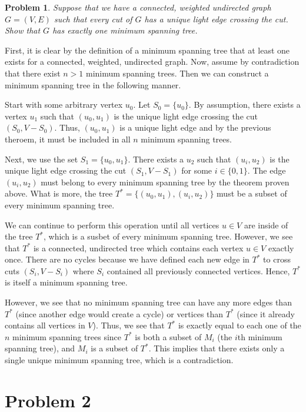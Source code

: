 \documentclass[psamsfonts]{amsart}
\newtheorem{prob}{Problem}[section]
\newenvironment{sol}{{\bfseries Solution}}{\qedsymbol}
\theoremstyle{definition}
\theoremstyle{remark}
\numberwithin{equation}{section}
\begin{document}
\begin{prob}
Suppose that we have a connected, weighted undirected graph $G = (V,E)$ such that
every cut of $G$ has a unique light edge crossing the cut. Show that $G$ has exactly one
minimum spanning tree.
\end{prob}

\begin{sol}
First, it is clear by the definition of a minimum spanning tree that at least one exists for a connected, weighted, undirected graph. Now, assume by contradiction that there exist $n > 1$ minimum spanning trees. Then we can construct a minimum spanning tree in the following manner.

Start with some arbitrary vertex $u_0$. Let $S_0 = \{ u_0 \}$. By assumption, there exists a vertex $u_1$ such that $(u_0, u_1)$ is the unique light edge crossing the cut $(S_0, V - S_0)$. Thus, $(u_0, u_1)$ is a unique light edge and by the previous theroem, it must be included in all $n$ minimum spanning trees. 

Next, we use the set $S_1 = \{ u_0, u_1 \}$. There exists a $u_2$ such that $(u_i, u_2)$ is the unique light edge crossing the cut $(S_1, V - S_1)$ for some $i \in \{0, 1 \}$. The edge $(u_i, u_2)$ must belong to every minimum spanning tree by the theorem proven above. What is more, the tree $T^* = \{ (u_0, u_1), (u_i, u_2) \}$ must be a subset of every minimum spanning tree. 

We can continue to perform this operation until all vertices $u \in V$ are inside of the tree $T^*$, which is a susbet of every minimum spanning tree. However, we see that $T^*$ is a connected, undirected tree which contains each vertex $u \in V$ exactly once. There are no cycles because we have defined each new edge in $T^*$ to cross cuts $(S_i, V - S_i)$ where $S_i$ contained all previously connected vertices. Hence, $T^*$ is itself a minimum spanning tree. 

However, we see that no minimum spanning tree can have any more edges than $T^*$ (since another edge would create a cycle) or vertices than $T^*$ (since it already contains all vertices in $V$). Thus, we see that $T^*$ is exactly equal to each one of the $n$ minimum spanning trees since $T^*$ is both a subset of $M_i$ (the $i$th minimum spanning tree), and $M_i$ is a subset of $T^*$. This implies that there exists only a single unique minimum spanning tree, which is a contradiction.
\end{sol}

\section{Problem 2}
\end{document}

